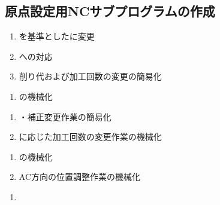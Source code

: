 \clearpage
\subsection{原点設定用NCサブプログラムの作成\TBW}



\begin{enumerate}[label=\sarrow]
\item \IDCenter を基準とした\EndFacecutMilling に変更
\item \ODCornerR への対応
\item {}削り代および加工回数の変更の簡易化
\end{enumerate}



\begin{enumerate}[label=\sarrow]
\item \CurvedOutcutMilling の機械化
\end{enumerate}



\begin{enumerate}[label=\sarrow]
\item \KeywayPos・\KeywayWidth 補正変更作業の簡易化
\item \KeywayWidth に応じた加工回数の変更作業の機械化
\end{enumerate}



\begin{enumerate}[label=\sarrow]
\item \EndFaceChamferMilling の機械化
\item AC方向の位置調整作業の機械化
\end{enumerate}



\begin{enumerate}[label=\sarrow]
\item
\end{enumerate}


